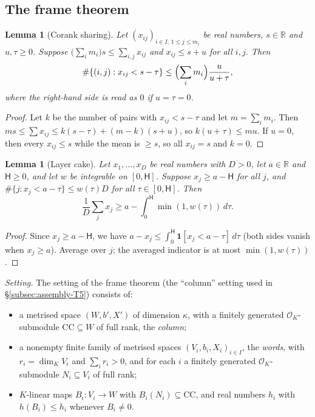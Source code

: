 \documentclass[10pt]{amsart}
\newtheorem{lemma}[theorem]{Lemma}
\theoremstyle{definition}
\theoremstyle{remark}
\newcommand{\R}{\mathbb R}
\begin{document}
\subsection{The frame theorem}\label{subsec:frame-thm}

\begin{lemma}[Corank sharing]\label{lem:F-share}
Let $(x_{ij})_{i\in I,\,1\le j\le m_i}$ be real numbers, $s\in\R$ and $u,\tau\ge0$. Suppose $\bigl(\sum_im_i\bigr)s\le\sum_{i,j}x_{ij}$ and $x_{ij}\le s+u$ for all $i,j$. Then
\[
\#\{(i,j):x_{ij}<s-\tau\}\le\Bigl(\sum_im_i\Bigr)\frac{u}{u+\tau},
\]
where the right-hand side is read as $0$ if $u=\tau=0$.
\end{lemma}
\begin{proof}
Let $k$ be the number of pairs with $x_{ij}<s-\tau$ and let $m=\sum_im_i$. Then $ms\le\sum x_{ij}\le k(s-\tau)+(m-k)(s+u)$, so $k(u+\tau)\le mu$. If $u=0$, then every $x_{ij}\le s$ while the mean is $\ge s$, so all $x_{ij}=s$ and $k=0$.
\end{proof}

\begin{lemma}[Layer cake]\label{lem:layercake}
Let $x_1,\dots,x_D$ be real numbers with $D>0$, let $a\in\R$ and $\mathsf H\ge0$, and let $w$ be integrable on $[0,\mathsf H]$. Suppose $x_j\ge a-\mathsf H$ for all $j$, and $\#\{j:x_j<a-\tau\}\le w(\tau)D$ for all $\tau\in[0,\mathsf H]$. Then
\[
\frac1D\sum_jx_j\ge a-\int_0^{\mathsf H}\min(1,w(\tau))\,d\tau .
\]
\end{lemma}
\begin{proof}
Since $x_j\ge a-\mathsf H$, we have $a-x_j\le\int_0^{\mathsf H}\mathbf 1[x_j<a-\tau]\,d\tau$ (both sides vanish when $x_j\ge a$). Average over $j$; the averaged indicator is at most $\min(1,w(\tau))$.
\end{proof}

\smallskip
\noindent\emph{Setting.} The setting of the frame theorem (the ``column'' setting used in \S\ref{subsec:assembly-T5}) consists of:
\begin{itemize}
\item a metrised space $(W,b',X')$ of dimension $\kappa$, with a finitely generated $\mathcal O_K$-submodule $\mathrm{CC}\subseteq W$ of full rank, the \emph{column};
\item a nonempty finite family of metrised spaces $(V_i,b_i,X_i)_{i\in I}$, the \emph{words}, with $r_i=\dim_KV_i$ and $\sum_ir_i>0$, and for each $i$ a finitely generated $\mathcal O_K$-submodule $N_i\subseteq V_i$ of full rank;
\item $K$-linear maps $B_i\colon V_i\to W$ with $B_i(N_i)\subseteq\mathrm{CC}$, and real numbers $h_i$ with $h(B_i)\le h_i$ whenever $B_i\ne0$.
\end{itemize}
\end{document}
